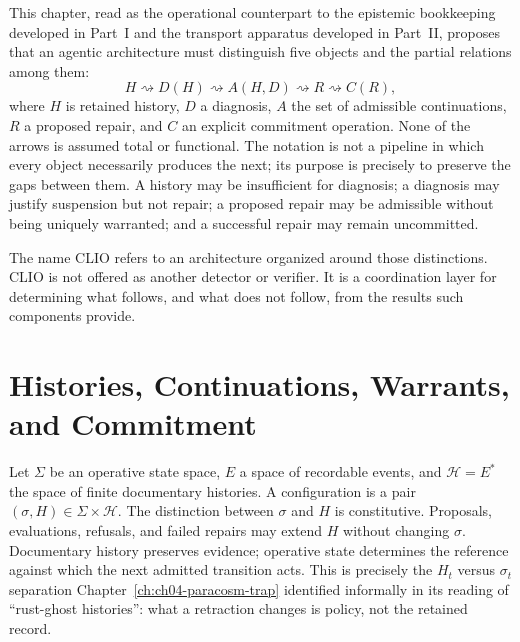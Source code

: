 This chapter, read as the operational counterpart to the epistemic bookkeeping developed in Part~I and the transport apparatus developed in Part~II, proposes that an agentic architecture must distinguish five objects and the partial relations among them:
\[
H \rightsquigarrow D(H) \rightsquigarrow A(H,D) \rightsquigarrow R \rightsquigarrow C(R),
\]
where $H$ is retained history, $D$ a diagnosis, $A$ the set of admissible continuations, $R$ a proposed repair, and $C$ an explicit commitment operation. None of the arrows is assumed total or functional. The notation is not a pipeline in which every object necessarily produces the next; its purpose is precisely to preserve the gaps between them. A history may be insufficient for diagnosis; a diagnosis may justify suspension but not repair; a proposed repair may be admissible without being uniquely warranted; and a successful repair may remain uncommitted.

The name CLIO refers to an architecture organized around those distinctions. CLIO is not offered as another detector or verifier. It is a coordination layer for determining what follows, and what does not follow, from the results such components provide.

\section{Histories, Continuations, Warrants, and Commitment}

Let $\Sigma$ be an operative state space, $E$ a space of recordable events, and $\mathcal{H} = E^\ast$ the space of finite documentary histories. A configuration is a pair $(\sigma, H) \in \Sigma \times \mathcal{H}$. The distinction between $\sigma$ and $H$ is constitutive. Proposals, evaluations, refusals, and failed repairs may extend $H$ without changing $\sigma$. Documentary history preserves evidence; operative state determines the reference against which the next admitted transition acts. This is precisely the $H_t$ versus $\sigma_t$ separation Chapter~\ref{ch:ch04-paracosm-trap} identified informally in its reading of ``rust-ghost histories'': what a retraction changes is policy, not the retained record.

